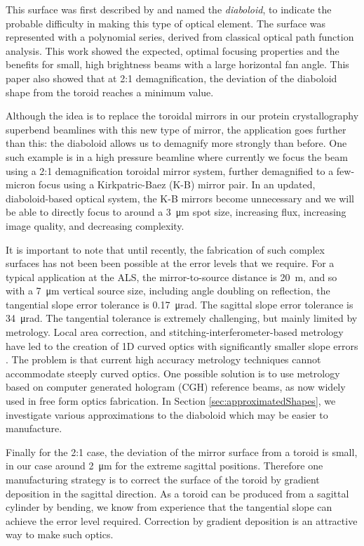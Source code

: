 \documentclass{iucr}       %
\begin{document}
This surface was first described by \cite{McKinneySPIE2009} and named the {\it diaboloid}, to indicate the probable difficulty in making this type of optical element. The surface was represented with a polynomial series, derived from classical optical path function analysis. This work showed the expected, optimal focusing properties and the benefits for small, high brightness beams with a large horizontal fan angle. This paper also showed that at 2:1 demagnification, the deviation of the diaboloid shape from the toroid reaches a minimum value.

Although the idea is to replace the toroidal mirrors in our protein crystallography superbend beamlines with this new type of mirror, the application goes further than this: the diaboloid allows us to demagnify more strongly than before. One such example is in a high pressure beamline where currently we focus the beam using a 2:1 demagnification toroidal mirror system, further demagnified to a few-micron focus using a Kirkpatric-Baez (K-B) mirror pair. In an updated, diaboloid-based optical system, the K-B mirrors become unnecessary and we will be able to directly focus to around a \SI{3}{\micro\meter} spot size, increasing flux, increasing image quality, and decreasing complexity.

It is important to note that until recently, the fabrication of such complex surfaces has not been been possible at the error levels that we require. For a typical application at the ALS, the mirror-to-source distance is \SI{20}{\meter}, and so with a \SI{7}{\micro\meter} vertical source size, including angle doubling on reflection, the tangential slope error tolerance is \SI{0.17}{\micro\radian}. The sagittal slope error tolerance is \SI{34}{\micro\radian}. The tangential tolerance is extremely challenging, but mainly limited by metrology. Local area correction, and stitching-interferometer-based metrology have led to the creation of 1D curved optics with significantly smaller slope errors \cite{Yamauchi2002}. The problem is that current high accuracy metrology techniques cannot accommodate steeply curved optics. One possible solution is to use metrology based on computer generated hologram (CGH) reference beams, as now widely used in free form optics fabrication. In Section \ref{sec:approximatedShapes}, we investigate various approximations to the diaboloid which may be easier to manufacture.

Finally for the 2:1 case, the deviation of the mirror surface from a toroid is small, in our case around \SI{2}{\micro\meter} for the extreme sagittal positions. Therefore one manufacturing strategy is to correct the surface of the toroid by gradient deposition in the sagittal direction. As a toroid can be produced from a sagittal cylinder by bending, we know from experience that the tangential slope can achieve the error level required. Correction by gradient deposition is an attractive way to make such optics. 
\end{document}
